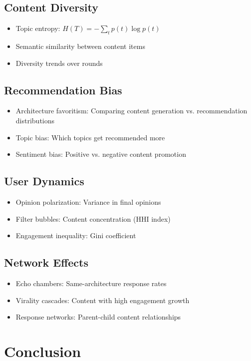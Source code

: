\documentclass[11pt]{article}
\begin{document}
\subsection{Content Diversity}
\begin{itemize}
    \item Topic entropy: $H(T) = -\sum_t p(t) \log p(t)$
    \item Semantic similarity between content items
    \item Diversity trends over rounds
\end{itemize}

\subsection{Recommendation Bias}
\begin{itemize}
    \item Architecture favoritism: Comparing content generation vs. recommendation distributions
    \item Topic bias: Which topics get recommended more
    \item Sentiment bias: Positive vs. negative content promotion
\end{itemize}

\subsection{User Dynamics}
\begin{itemize}
    \item Opinion polarization: Variance in final opinions
    \item Filter bubbles: Content concentration (HHI index)
    \item Engagement inequality: Gini coefficient
\end{itemize}

\subsection{Network Effects}
\begin{itemize}
    \item Echo chambers: Same-architecture response rates
    \item Virality cascades: Content with high engagement growth
    \item Response networks: Parent-child content relationships
\end{itemize}

\section{Conclusion}
\end{document}

